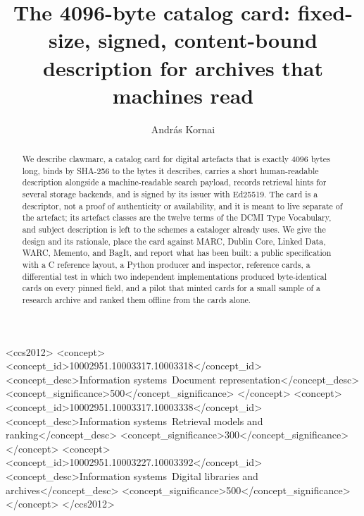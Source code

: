 \documentclass[sigconf]{acmart}
\begin{document}
\title{The 4096-byte catalog card: fixed-size, signed, content-bound description for archives that machines read}

\author{Andr\'as Kornai}

\begin{abstract}
We describe clawmarc, a catalog card for digital artefacts that is exactly
4096 bytes long, binds by SHA-256 to the bytes it describes, carries a short
human-readable description alongside a machine-readable search payload,
records retrieval hints for several storage backends, and is signed by its
issuer with Ed25519. The card is a descriptor, not a proof of authenticity or
availability, and it is meant to live separate of the artefact; its artefact
classes are the twelve terms of the DCMI Type Vocabulary, and subject
description is left to the schemes a cataloger already uses. We give the
design and its rationale, place the card against MARC, Dublin Core, Linked
Data, WARC, Memento, and BagIt, and report what has been built: a public
specification with a C reference layout, a Python producer and inspector,
reference cards, a differential test in which two independent implementations
produced byte-identical cards on every pinned field, and a pilot that minted
cards for a small sample of a research archive and ranked them offline from
the cards alone.
\end{abstract}

\begin{CCSXML}
<ccs2012>
<concept>
<concept_id>10002951.10003317.10003318</concept_id>
<concept_desc>Information systems~Document representation</concept_desc>
<concept_significance>500</concept_significance>
</concept>
<concept>
<concept_id>10002951.10003317.10003338</concept_id>
<concept_desc>Information systems~Retrieval models and ranking</concept_desc>
<concept_significance>300</concept_significance>
</concept>
<concept>
<concept_id>10002951.10003227.10003392</concept_id>
<concept_desc>Information systems~Digital libraries and archives</concept_desc>
<concept_significance>500</concept_significance>
</concept>
</ccs2012>
\end{CCSXML}

\end{document}
